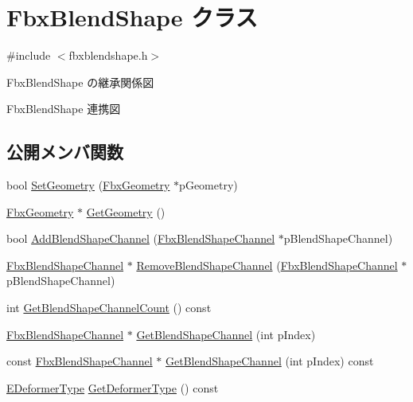 \hypertarget{class_fbx_blend_shape}{}\section{Fbx\+Blend\+Shape クラス}
\label{class_fbx_blend_shape}


{\ttfamily \#include $<$fbxblendshape.\+h$>$}



Fbx\+Blend\+Shape の継承関係図


Fbx\+Blend\+Shape 連携図
\subsection*{公開メンバ関数}
\begin{DoxyCompactItemize}
\item 
bool \hyperlink{class_fbx_blend_shape_aafaf4d30fd6dca540ad6f0f0b1062def}{Set\+Geometry} (\hyperlink{class_fbx_geometry}{Fbx\+Geometry} $\ast$p\+Geometry)
\item 
\hyperlink{class_fbx_geometry}{Fbx\+Geometry} $\ast$ \hyperlink{class_fbx_blend_shape_a2cea3099fb3f8ba5616d1b794371909e}{Get\+Geometry} ()
\item 
bool \hyperlink{class_fbx_blend_shape_a0513dbd59321be93fd18f3aeae79b49a}{Add\+Blend\+Shape\+Channel} (\hyperlink{class_fbx_blend_shape_channel}{Fbx\+Blend\+Shape\+Channel} $\ast$p\+Blend\+Shape\+Channel)
\item 
\hyperlink{class_fbx_blend_shape_channel}{Fbx\+Blend\+Shape\+Channel} $\ast$ \hyperlink{class_fbx_blend_shape_ae68aaed993da38c536a35a698c5d435a}{Remove\+Blend\+Shape\+Channel} (\hyperlink{class_fbx_blend_shape_channel}{Fbx\+Blend\+Shape\+Channel} $\ast$p\+Blend\+Shape\+Channel)
\item 
int \hyperlink{class_fbx_blend_shape_aed732607e7af47260646f394897a6855}{Get\+Blend\+Shape\+Channel\+Count} () const
\item 
\hyperlink{class_fbx_blend_shape_channel}{Fbx\+Blend\+Shape\+Channel} $\ast$ \hyperlink{class_fbx_blend_shape_aac445f8468f3135f5c810ef51a089ff2}{Get\+Blend\+Shape\+Channel} (int p\+Index)
\item 
const \hyperlink{class_fbx_blend_shape_channel}{Fbx\+Blend\+Shape\+Channel} $\ast$ \hyperlink{class_fbx_blend_shape_a2f945fdf198655b0434e5bde7d897a8a}{Get\+Blend\+Shape\+Channel} (int p\+Index) const
\item 
\hyperlink{class_fbx_deformer_a07e2cfb767191ba5c8799fdfbfe3eaf6}{E\+Deformer\+Type} \hyperlink{class_fbx_blend_shape_afc886286ac95264b993335d8b3954b4f}{Get\+Deformer\+Type} () const

\end{DoxyCompactItemize}
